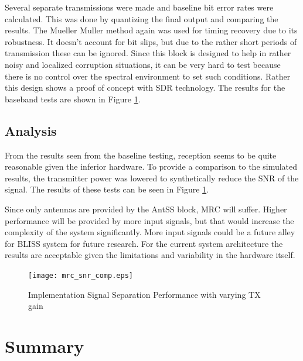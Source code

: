 Several separate transmissions were made and baseline bit error rates were calculated.  This was done by quantizing the final output and comparing the results.  The Mueller Muller method again was used for timing recovery due to its robustness.  It doesn't account for bit slips, but due to the rather short periods of transmission these can be ignored.  Since this block is designed to help in rather noisy and localized corruption situations, it can be very hard to test because there is no control over the spectral environment to set such conditions.  Rather this design shows a proof of concept with SDR technology.  The results for the baseband tests are shown in Figure \ref{ssep_snr_tests}.\\


\subsection{Analysis}

From the results seen from the baseline testing, reception seems to be quite reasonable given the inferior hardware. To provide a comparison to the simulated results, the transmitter power was lowered to synthetically reduce the SNR of the signal.  The results of these tests can be seen in Figure \ref{ssep_snr_tests}.   

Since only antennas are provided by the AntSS block, MRC will suffer.  Higher performance will be provided by more input signals, but that would increase the complexity of the system significantly.  More input signals could be a future alley for BLISS system for future research.  For the current system architecture the results are acceptable given the limitations and variability in the hardware itself.\\

\begin{figure}\label{ssep_snr_tests}
\centering
\texttt{[image: mrc\_snr\_comp.eps]} %
\caption{Implementation Signal Separation Performance with varying TX gain}
\end{figure}

\section{Summary}

